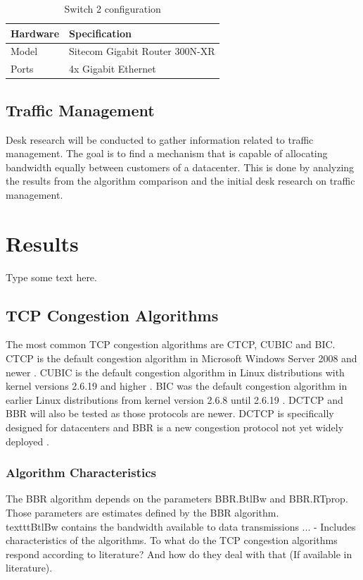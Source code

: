 \documentclass{article}
\begin{document}
		\begin{table}[H]
			\centering
			\caption{Switch 2 configuration}
			\begin{tabular}[H]{ | l | l | }
			\hline
			\textbf{Hardware} & \textbf{Specification} \\
			\hline  Model & Sitecom Gigabit Router 300N-XR\\
			\hline  Ports & 4x Gigabit Ethernet\\
			\hline
			\end{tabular}
			\label{table:spec3}
		\end{table}

	\subsection{Traffic Management}
	Desk research will be conducted to gather information related to traffic management. The goal is to find a mechanism that is capable of allocating bandwidth equally between customers of a datacenter. This is done by analyzing the results from the algorithm comparison and the initial desk research on traffic management. 

\section{Results}
Type some text here.

	\subsection{TCP Congestion Algorithms}
	The most common TCP congestion algorithms are CTCP, CUBIC and BIC. CTCP is the default congestion algorithm in Microsoft Windows Server 2008 and newer \cite{cubic-kernel-version}. CUBIC is the default congestion algorithm in Linux distributions with kernel versions 2.6.19 and higher \cite{cubic-kernel-version}. BIC was the default congestion algorithm in earlier Linux distributions from kernel version 2.6.8 until 2.6.19 \cite{bic-kernel-version} \cite{cubic-kernel-version}. DCTCP and BBR will also be tested as those protocols are newer. DCTCP is specifically designed for datacenters \cite{dctcp-congestion} and BBR is a new congestion protocol not yet widely deployed \cite{bbr-congestion}.
	
		\subsubsection{Algorithm Characteristics}
		The BBR algorithm depends on the parameters BBR.BtlBw and BBR.RTprop. Those parameters are estimates defined by the BBR algorithm. \\texttt{BtlBw} contains the bandwidth available to data transmissions ...
		- Includes characteristics of the algorithms. To what do the TCP congestion algorithms respond according to literature? And how do they deal with that (If available in literature).
		
\end{document}

